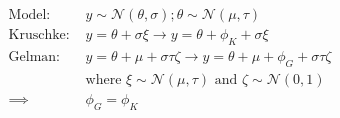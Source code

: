 \documentclass[varwidth=\linewidth]{standalone}
\begin{document}
$$\begin{aligned}
\textrm{Model: }& y \sim \mathcal{N}(\theta, \sigma); \theta \sim \mathcal{N}(\mu, \tau) \\
\textrm{Kruschke: }& y = \theta + \sigma\xi \rightarrow y = \theta + \phi_{K} + \sigma\xi \\
\textrm{Gelman: }& y = \theta + \mu + \sigma\tau\zeta \rightarrow y = \theta + \mu + \phi_{G} + \sigma\tau\zeta \\
&\textrm{where } \xi \sim \mathcal{N}(\mu, \tau) \textrm{ and } \zeta\sim\mathcal{N}(0, 1) \\
\implies& \phi_{G} = \phi_{K}
\end{aligned}$$
\end{document}
